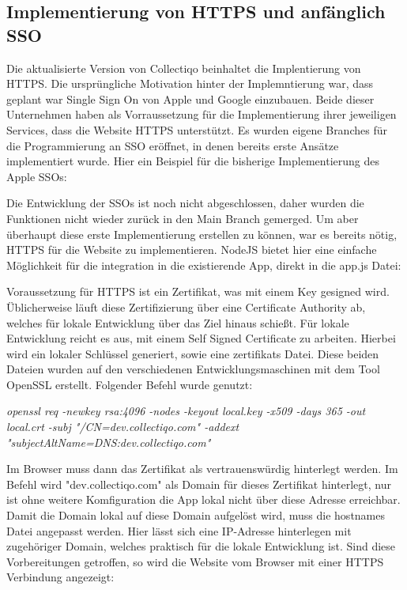 \subsection{Implementierung von HTTPS und anfänglich SSO}\label{subsec:implementierung-von-https}

Die aktualisierte Version von Collectiqo beinhaltet die Implentierung von HTTPS.
Die ursprüngliche Motivation hinter der Implemntierung war, dass geplant war Single Sign On von Apple und Google einzubauen.
Beide dieser Unternehmen haben als Vorraussetzung für die Implementierung ihrer jeweiligen Services, dass die Website HTTPS unterstützt.
Es wurden eigene Branches für die Programmierung an SSO eröffnet, in denen bereits erste Ansätze implementiert wurde.
Hier ein Beispiel für die bisherige Implementierung des Apple SSOs:


Die Entwicklung der SSOs ist noch nicht abgeschlossen, daher wurden die Funktionen nicht wieder zurück in den Main Branch gemerged.
Um aber überhaupt diese erste Implementierung erstellen zu können, war es bereits nötig, HTTPS für die Website zu implementieren.
NodeJS bietet hier eine einfache Möglichkeit für die integration in die existierende App, direkt in die app.js Datei:

\vspace{1em}

\vspace{1em}

Voraussetzung für HTTPS ist ein Zertifikat, was mit einem Key gesigned wird.
Üblicherweise läuft diese Zertifizierung über eine Certificate Authority ab, welches für lokale Entwicklung über das Ziel hinaus schießt.
Für lokale Entwicklung reicht es aus, mit einem Self Signed Certificate zu arbeiten.
Hierbei wird ein lokaler Schlüssel generiert, sowie eine zertifikats Datei.
Diese beiden Dateien wurden auf den verschiedenen Entwicklungsmaschinen mit dem Tool OpenSSL erstellt.
Folgender Befehl wurde genutzt:

\vspace{1em}
\textit{openssl req -newkey rsa:4096 -nodes -keyout local.key -x509 -days 365 -out local.crt -subj "/CN=dev.collectiqo.com" -addext "subjectAltName=DNS:dev.collectiqo.com"}
\vspace{1em}

Im Browser muss dann das Zertifikat als vertrauenswürdig hinterlegt werden.
Im Befehl wird "dev.collectiqo.com" als Domain für dieses Zertifikat hinterlegt, nur ist ohne weitere Komfiguration die App lokal nicht über diese Adresse erreichbar.
Damit die Domain lokal auf diese Domain aufgelöst wird, muss die hostnames Datei angepasst werden.
Hier lässt sich eine IP-Adresse hinterlegen mit zugehöriger Domain, welches praktisch für die lokale Entwicklung ist.
Sind diese Vorbereitungen getroffen, so wird die Website vom Browser mit einer HTTPS Verbindung angezeigt:


